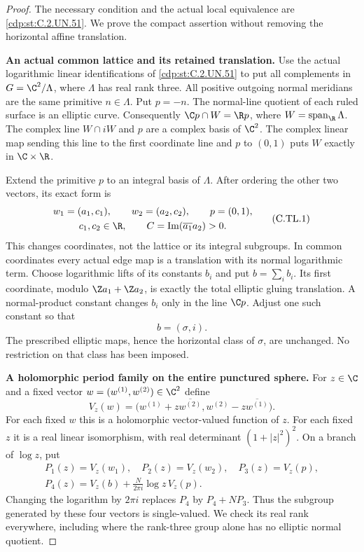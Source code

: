 \begin{proof}
The necessary condition and the actual local equivalence are
\ref{cdp:st:C.2.UN.51}. We prove the compact assertion without removing the
horizontal affine translation.

\par\medskip\noindent\textbf{An actual common lattice and its retained translation.}
Use the actual logarithmic linear identifications of \ref{cdp:st:C.2.UN.51} to put
all complements in $G=\C^2/\Lambda$, where $\Lambda$ has real
rank three. All positive outgoing normal meridians are the same
primitive $n\in\Lambda$. Put $p=-n$. The normal-line quotient of
each ruled surface is an elliptic curve. Consequently
$\C p\cap W=\R p$, where $W=\operatorname{span}_{\R}\Lambda$.
The complex line $W\cap iW$ and $p$ are a complex basis of
$\C^2$. The complex linear map sending this line to the first
coordinate line and $p$ to $(0,1)$ puts $W$ exactly in
$\C\times\R$.

Extend the primitive $p$ to an integral basis of $\Lambda$.
After ordering the other two vectors, its exact form is
\[
 \begin{gathered}
 w_1=(a_1,c_1),\qquad w_2=(a_2,c_2),\qquad p=(0,1),\\
 c_1,c_2\in\R,\qquad
 C=\operatorname{Im}(\overline{a_1}a_2)>0.
 \end{gathered}
 \tag{C.TL.1}\label{cdp:eq:C.TL.1}
\]
This changes coordinates, not the lattice or its integral
subgroups. In common coordinates every actual edge map is a
translation with its normal logarithmic term. Choose logarithmic
lifts of its constants $b_i$ and put $b=\sum_i b_i$.
Its first coordinate, modulo
$\Z a_1+\Z a_2$, is exactly the total elliptic gluing translation.
A normal-product constant changes $b_i$ only in the line
$\C p$. Adjust one such constant so that
\[
                         b=(\sigma,i).
 \tag{C.TL.2}\label{cdp:eq:C.TL.2}
\]
The prescribed elliptic maps, hence the horizontal class of
$\sigma$, are unchanged. No restriction on that class has been
imposed.

\par\medskip\noindent\textbf{A holomorphic period family on the entire punctured sphere.}
For $z\in\C$ and a fixed vector $w=(w^{(1)},w^{(2)})\in\C^2$
define
\[
 V_z(w)=
 \bigl(w^{(1)}+z\overline{w^{(2)}},
       w^{(2)}-z\overline{w^{(1)}}\bigr).
 \tag{C.TL.3}\label{cdp:eq:C.TL.3}
\]
For each fixed $w$ this is a holomorphic vector-valued function
of $z$. For each fixed $z$ it is a real linear isomorphism,
with real determinant $(1+|z|^2)^2$. On a branch of $\log z$,
put
\[
 \begin{gathered}
 P_1(z)=V_z(w_1),\quad P_2(z)=V_z(w_2),\quad
 P_3(z)=V_z(p),\\
 P_4(z)=V_z(b)+\frac{N}{2\pi i}\log z\,V_z(p).
 \end{gathered}
 \tag{C.TL.4}\label{cdp:eq:C.TL.4}
\]
Changing the logarithm by $2\pi i$ replaces $P_4$ by
$P_4+NP_3$. Thus the subgroup generated by these four vectors
is single-valued. We check its real rank everywhere, including
where the rank-three group alone has no elliptic normal quotient.


\end{proof}
